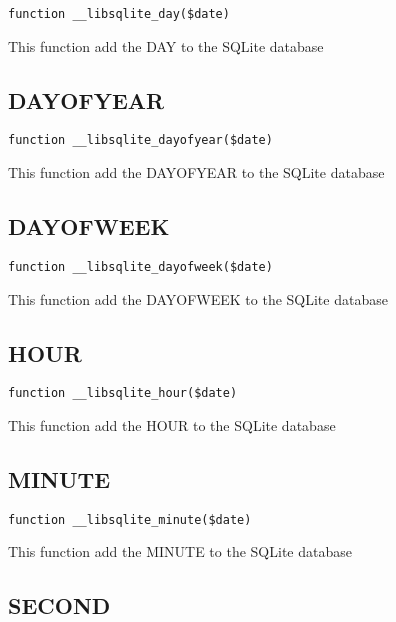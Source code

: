 \documentclass[a4paper]{book}
\begin{document}
\begin{lstlisting}
function __libsqlite_day($date)
\end{lstlisting}

This function add the DAY to the SQLite database

\hypertarget{toc320}{}
\subsection{DAYOFYEAR}

\begin{lstlisting}
function __libsqlite_dayofyear($date)
\end{lstlisting}

This function add the DAYOFYEAR to the SQLite database

\hypertarget{toc321}{}
\subsection{DAYOFWEEK}

\begin{lstlisting}
function __libsqlite_dayofweek($date)
\end{lstlisting}

This function add the DAYOFWEEK to the SQLite database

\hypertarget{toc322}{}
\subsection{HOUR}

\begin{lstlisting}
function __libsqlite_hour($date)
\end{lstlisting}

This function add the HOUR to the SQLite database

\hypertarget{toc323}{}
\subsection{MINUTE}

\begin{lstlisting}
function __libsqlite_minute($date)
\end{lstlisting}

This function add the MINUTE to the SQLite database

\hypertarget{toc324}{}
\subsection{SECOND}
\end{document}
